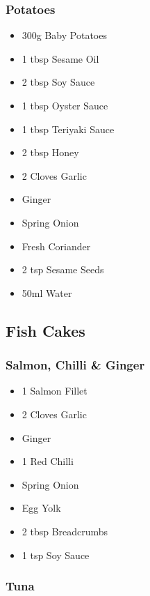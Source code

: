 \documentclass[11pt, english]{article}
\begin{document}
		\subsubsection*{Potatoes}

	\begin{itemize}
        \setlength\itemsep{0cm}
                \item 300g Baby Potatoes
		\item 1 tbsp Sesame Oil
		\item 2 tbsp Soy Sauce
		\item 1 tbsp Oyster Sauce
		\item 1 tbsp Teriyaki Sauce
		\item 2 tbsp Honey
		\item 2 Cloves Garlic
		\item Ginger
		\item Spring Onion
		\item Fresh Coriander
		\item 2 tsp Sesame Seeds
		\item 50ml Water
        \end{itemize}

\newpage
	
	\subsection{Fish Cakes}

		\subsubsection*{Salmon, Chilli \& Ginger}

	\begin{itemize}
        \setlength\itemsep{0cm}
                \item 1 Salmon Fillet
		\item 2 Cloves Garlic
		\item Ginger
		\item 1 Red Chilli
		\item Spring Onion
		\item Egg Yolk
		\item 2 tbsp Breadcrumbs
		\item 1 tsp Soy Sauce
        \end{itemize}

		\subsubsection*{Tuna}
\end{document}
